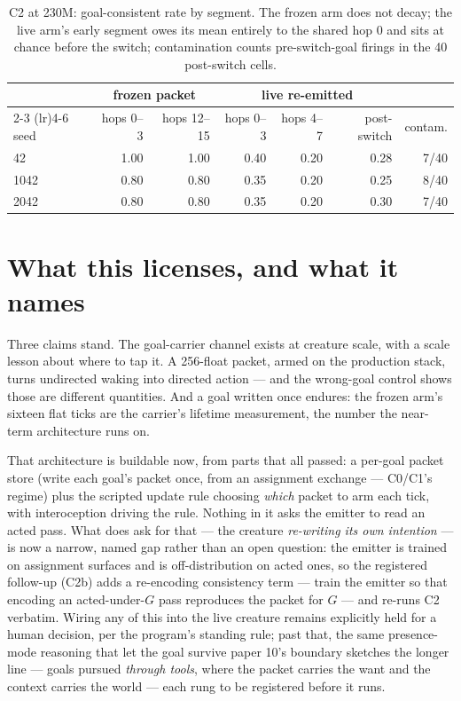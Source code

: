 \documentclass[11pt]{article}
\begin{document}
\begin{table}[t]
\centering
\small
\setlength{\tabcolsep}{5pt}
\begin{tabular}{lrrrrrr}
\toprule
& \multicolumn{2}{c}{frozen packet} & \multicolumn{3}{c}{live re-emitted} & \\
\cmidrule(lr){2-3} \cmidrule(lr){4-6}
seed & hops 0--3 & hops 12--15 & hops 0--3 & hops 4--7 & post-switch & contam. \\
\midrule
42 & 1.00 & 1.00 & 0.40 & 0.20 & 0.28 & 7/40 \\
1042 & 0.80 & 0.80 & 0.35 & 0.20 & 0.25 & 8/40 \\
2042 & 0.80 & 0.80 & 0.35 & 0.20 & 0.30 & 7/40 \\
\bottomrule
\end{tabular}
\caption{C2 at 230M: goal-consistent rate by segment. The frozen arm
does not decay; the live arm's early segment owes its mean entirely to
the shared hop 0 and sits at chance before the switch; contamination
counts pre-switch-goal firings in the 40 post-switch cells.}
\label{tab:c2}
\end{table}

\section{What this licenses, and what it names}

Three claims stand. The goal-carrier channel exists at creature scale,
with a scale lesson about where to tap it. A 256-float packet, armed on
the production stack, turns undirected waking into directed action ---
and the wrong-goal control shows those are different quantities. And a
goal written once endures: the frozen arm's sixteen flat ticks are the
carrier's lifetime measurement, the number the near-term architecture
runs on.

That architecture is buildable now, from parts that all passed: a
per-goal packet store (write each goal's packet once, from an assignment
exchange --- C0/C1's regime) plus the scripted update rule choosing
\emph{which} packet to arm each tick, with interoception driving the
rule. Nothing in it asks the emitter to read an acted pass. What does
ask for that --- the creature \emph{re-writing its own intention} ---
is now a narrow, named gap rather than an open question: the emitter is
trained on assignment surfaces and is off-distribution on acted ones,
so the registered follow-up (C2b) adds a re-encoding consistency term
--- train the emitter so that encoding an acted-under-$G$ pass
reproduces the packet for $G$ --- and re-runs C2 verbatim. Wiring any of
this into the live creature remains explicitly held for a human
decision, per the program's standing rule; past that, the same
presence-mode reasoning that let the goal survive paper 10's boundary
sketches the longer line --- goals pursued \emph{through tools}, where
the packet carries the want and the context carries the world --- each
rung to be registered before it runs.
\end{document}

